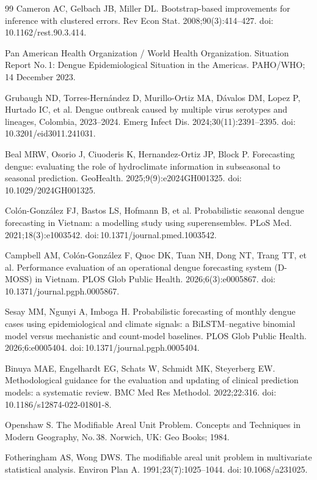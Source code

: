 \documentclass[11pt,a4paper]{article}
\begin{document}
\begin{thebibliography}{99}
 Cameron AC, Gelbach JB, Miller DL. Bootstrap-based improvements for inference with clustered errors. Rev Econ Stat. 2008;90(3):414--427. doi:\,10.1162/rest.90.3.414.

 Pan American Health Organization / World Health Organization. Situation Report No.\,1: Dengue Epidemiological Situation in the Americas. PAHO/WHO; 14 December 2023.

 Grubaugh ND, Torres-Hern\'andez D, Murillo-Ortiz MA, D\'avalos DM, Lopez P, Hurtado IC, et al. Dengue outbreak caused by multiple virus serotypes and lineages, Colombia, 2023--2024. Emerg Infect Dis. 2024;30(11):2391--2395. doi:\,10.3201/eid3011.241031.

 Beal MRW, Osorio J, Ciuoderis K, Hernandez-Ortiz JP, Block P. Forecasting dengue: evaluating the role of hydroclimate information in subseasonal to seasonal prediction. GeoHealth. 2025;9(9):e2024GH001325. doi:\,10.1029/2024GH001325.

 Col\'{o}n-Gonz\'{a}lez FJ, Bastos LS, Hofmann B, et al. Probabilistic seasonal dengue forecasting in Vietnam: a modelling study using superensembles. PLoS Med. 2021;18(3):e1003542. doi:\,10.1371/journal.pmed.1003542.

 Campbell AM, Col\'on-Gonz\'alez F, Quoc DK, Tuan NH, Dong NT, Trang TT, et al. Performance evaluation of an operational dengue forecasting system (D-MOSS) in Vietnam. PLOS Glob Public Health. 2026;6(3):e0005867. doi:\,10.1371/journal.pgph.0005867.

 Sesay MM, Ngunyi A, Imboga H. Probabilistic forecasting of monthly dengue cases using epidemiological and climate signals: a BiLSTM--negative binomial model versus mechanistic and count-model baselines. PLOS Glob Public Health. 2026;6:e0005404. doi:\,10.1371/journal.pgph.0005404.

 Binuya MAE, Engelhardt EG, Schats W, Schmidt MK, Steyerberg EW. Methodological guidance for the evaluation and updating of clinical prediction models: a systematic review. BMC Med Res Methodol. 2022;22:316. doi:\,10.1186/s12874-022-01801-8.

 Openshaw S. The Modifiable Areal Unit Problem. Concepts and Techniques in Modern Geography, No.\,38. Norwich, UK: Geo Books; 1984.

 Fotheringham AS, Wong DWS. The modifiable areal unit problem in multivariate statistical analysis. Environ Plan A. 1991;23(7):1025--1044. doi:\,10.1068/a231025.


\end{thebibliography}
\end{document}
